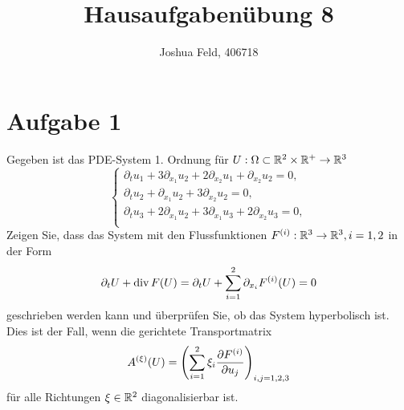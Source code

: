 \documentclass{exercise}
\institute{Applied and Computational Mathematics}
\title{Hausaufgabenübung 8}
\author{Joshua Feld, 406718}
\begin{document}
    \maketitle


    \section*{Aufgabe 1}

    \begin{problem}
        Gegeben ist das PDE-System 1. Ordnung für \(U: \Omega \subset \R^2 \times \R^+ \to \R^3\)
        \[
            \left\{\begin{array}{l}
                \partial_t u_1 + 3\partial_{x_1}u_2 + 2\partial_{x_2}u_1 + \partial_{x_2}u_2 = 0,\\
                \partial_t u_2 + \partial_{x_1}u_2 + 3\partial_{x_2}u_2 = 0,\\
                \partial_t u_3 + 2\partial_{x_1}u_2 + 3\partial_{x_1}u_3 + 2\partial_{x_2}u_3 = 0,\\
            \end{array}\right.
        \]
        Zeigen Sie, dass das System mit den Flussfunktionen \(F^{\parentheses*{i}}: \R^3 \to \R^3, i = 1, 2\) in der Form
        \[
            \partial_t U + \vecdiv F\parentheses*{U} = \partial_t U + \sum_{i = 1}^2 \partial_{x_i}F^{\parentheses*{i}}\parentheses*{U} = 0
        \]
        geschrieben werden kann und überprüfen Sie, ob das System hyperbolisch ist.
        Dies ist der Fall, wenn die gerichtete Transportmatrix
        \[
            A^{\parentheses*{\xi}}\parentheses*{U} = \parentheses*{\sum_{i = 1}^2 \xi_i\frac{\partial F^{\parentheses*{i}}}{\partial u_j}}_{i, j = 1, 2, 3}
        \]
        für alle Richtungen \(\xi \in \R^2\) diagonalisierbar ist.
    \end{problem}
\end{document}
